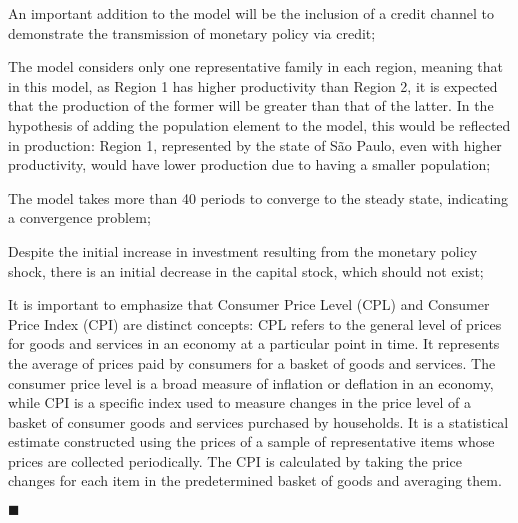 \documentclass[../thesis.tex]{subfiles}
\begin{document}
\begin{enumerate*}[label=(\arabic*)]
	
	\item An important addition to the model will be the inclusion of a credit channel to demonstrate the transmission of monetary policy via credit;
	
	\item The model considers only one representative family in each region, meaning that in this model, as Region 1 has higher productivity than Region 2, it is expected that the production of the former will be greater than that of the latter. In the hypothesis of adding the population element to the model, this would be reflected in production: Region 1, represented by the state of São Paulo, even with higher productivity, would have lower production due to having a smaller population;
	
	\item The model takes more than 40 periods to converge to the steady state, indicating a convergence problem;
	
	\item Despite the initial increase in investment resulting from the monetary policy shock, there is an initial decrease in the capital stock, which should not exist;
	
	\item It is important to emphasize that Consumer Price Level (CPL) and Consumer Price Index (CPI) are distinct concepts: CPL refers to the general level of prices for goods and services in an economy at a particular point in time. It represents the average of prices paid by consumers for a basket of goods and services. The consumer price level is a broad measure of inflation or deflation in an economy, while CPI is a specific index used to measure changes in the price level of a basket of consumer goods and services purchased by households. It is a statistical estimate constructed using the prices of a sample of representative items whose prices are collected periodically. The CPI is calculated by taking the price changes for each item in the predetermined basket of goods and averaging them.
	
\end{enumerate*} \hfill $\blacksquare$
\end{document}
